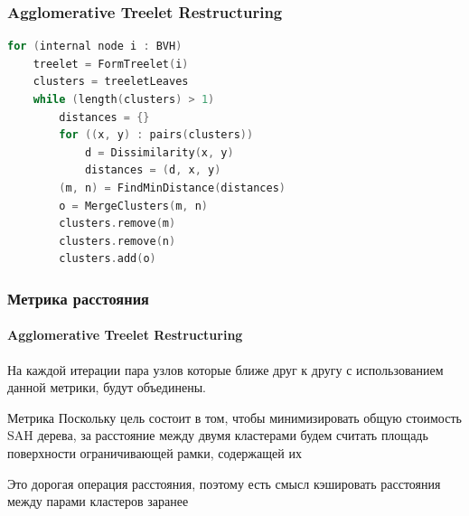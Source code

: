 \documentclass{beamer}
\begin{document}
\begin{frame}[fragile]
    \frametitle{Agglomerative Treelet Restructuring}
    \begin{lstlisting}[language=C++,basicstyle=\ttfamily,keywordstyle=\color{blue}]
for (internal node i : BVH)
    treelet = FormTreelet(i)
    clusters = treeletLeaves
    while (length(clusters) > 1)
        distances = {}
        for ((x, y) : pairs(clusters))
            d = Dissimilarity(x, y)
            distances = (d, x, y)
        (m, n) = FindMinDistance(distances)
        o = MergeClusters(m, n)
        clusters.remove(m)
        clusters.remove(n)
        clusters.add(o)
    \end{lstlisting}
\end{frame}

\begin{frame}
    \frametitle{Метрика расстояния}
    \framesubtitle{Agglomerative Treelet Restructuring}
    \begin{block}{}
        На каждой итерации пара узлов
        которые ближе друг к другу с использованием данной метрики, будут объединены.
    \end{block}

    \begin{block}{Метрика}
        Поскольку цель состоит в том, чтобы минимизировать общую стоимость SAH дерева,
        за расстояние между двумя кластерами будем считать площадь поверхности
        ограничивающей рамки, содержащей их
    \end{block}

    Это дорогая операция расстояния, поэтому есть смысл кэшировать расстояния между парами кластеров
    заранее 
\end{frame}
\end{document}
